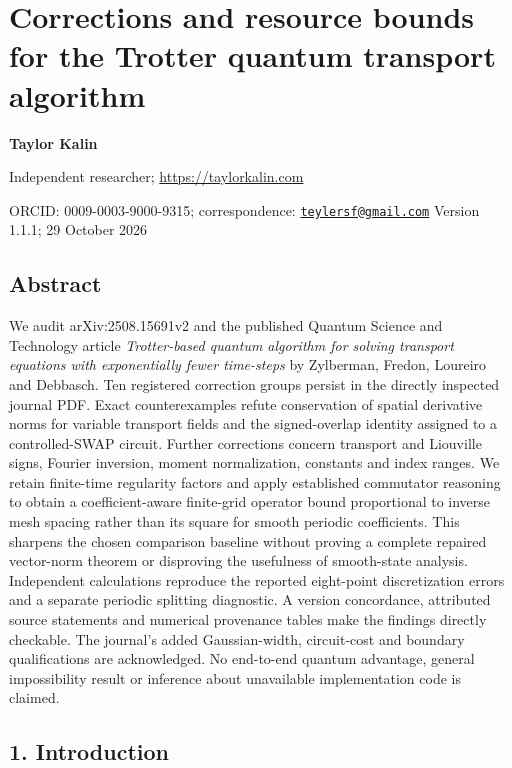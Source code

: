 \section{Corrections and resource bounds for the Trotter quantum
transport
algorithm}\label{corrections-and-resource-bounds-for-the-trotter-quantum-transport-algorithm}

\textbf{Taylor Kalin}

Independent researcher; \url{https://taylorkalin.com}

ORCID: 0009-0003-9000-9315; correspondence:
\href{mailto:teylersf@gmail.com}{\nolinkurl{teylersf@gmail.com}} Version
1.1.1; 29 October 2026

\subsection{Abstract}\label{abstract}

We audit arXiv:2508.15691v2 and the published Quantum Science and
Technology article \emph{Trotter-based quantum algorithm for solving
transport equations with exponentially fewer time-steps} by Zylberman,
Fredon, Loureiro and Debbasch. Ten registered correction groups persist
in the directly inspected journal PDF. Exact counterexamples refute
conservation of spatial derivative norms for variable transport fields
and the signed-overlap identity assigned to a controlled-SWAP circuit.
Further corrections concern transport and Liouville signs, Fourier
inversion, moment normalization, constants and index ranges. We retain
finite-time regularity factors and apply established commutator
reasoning to obtain a coefficient-aware finite-grid operator bound
proportional to inverse mesh spacing rather than its square for smooth
periodic coefficients. This sharpens the chosen comparison baseline
without proving a complete repaired vector-norm theorem or disproving
the usefulness of smooth-state analysis. Independent calculations
reproduce the reported eight-point discretization errors and a separate
periodic splitting diagnostic. A version concordance, attributed source
statements and numerical provenance tables make the findings directly
checkable. The journal's added Gaussian-width, circuit-cost and boundary
qualifications are acknowledged. No end-to-end quantum advantage,
general impossibility result or inference about unavailable
implementation code is claimed.

\subsection{1. Introduction}\label{introduction}

